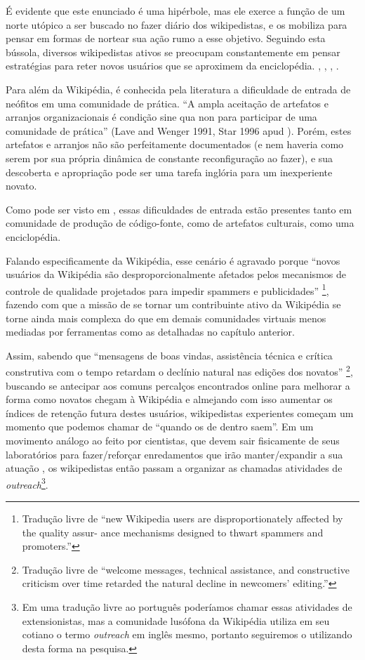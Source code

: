 É evidente que este enunciado é uma hipérbole, mas ele exerce a função de um norte utópico a ser buscado no fazer diário dos wikipedistas, e os mobiliza para pensar em formas de nortear sua ação rumo a esse objetivo. Seguindo esta bússola, diversos wikipedistas ativos se preocupam constantemente em pensar estratégias para reter novos usuários que se aproximem da enciclopédia. \citep{faulkner_etiquette_2012}, \citep{suh_singularity_2009}, \citep{musicant_mentoring_2011}, \citep{narayan_wikipedia_2017}.

Para além da Wikipédia, é conhecida pela literatura a dificuldade de entrada de neófitos em uma comunidade de prática. ``A ampla aceitação de artefatos e arranjos organizacionais é condição sine qua non para participar de uma comunidade de prática'' (Lave and Wenger 1991, Star 1996 apud \cite{feitosa_cidadao_2010}). Porém, estes artefatos e arranjos não são perfeitamente documentados (e nem haveria como serem por sua própria dinâmica de constante reconfiguração ao fazer), e sua descoberta e apropriação pode ser uma tarefa inglória para um inexperiente novato.

Como pode ser visto em \citep{steinmacher_social_2015}, essas dificuldades de entrada estão presentes tanto em comunidade de produção de código-fonte, como de artefatos culturais, como uma enciclopédia.

Falando especificamente da Wikipédia, esse cenário é agravado porque ``novos usuários da Wikipédia são desproporcionalmente afetados pelos mecanismos de controle de qualidade projetados para impedir spammers e publicidades'' \citep{schneider_accept_2014} \footnote{Tradução livre de ``new Wikipedia users are disproportionately affected by the quality assur- ance mechanisms designed to thwart spammers and promoters.''}, fazendo com que a missão de se tornar um contribuinte ativo da Wikipédia se torne ainda mais complexa do que em demais comunidades virtuais menos mediadas por ferramentas como as detalhadas no capítulo anterior.

Assim, sabendo que ``mensagens de boas vindas, assistência técnica e crítica construtiva com o tempo retardam o declínio natural nas edições dos novatos'' \citep{choi_socialization_2010}\footnote{Tradução livre de ``welcome messages, technical assistance, and constructive criticism over time retarded the natural decline in newcomers’ editing.''}, buscando se antecipar aos comuns percalços encontrados online para melhorar a forma como novatos chegam à Wikipédia e almejando com isso aumentar os índices de retenção futura destes usuários, wikipedistas experientes começam um momento que podemos chamar de  ``quando os de dentro saem''. Em um movimento análogo ao feito por cientistas, que devem sair fisicamente de seus laboratórios para fazer/reforçar enredamentos que irão manter/expandir a sua atuação \citep{latour_ciencia_1987}, os wikipedistas então passam a organizar as chamadas atividades de \textit{outreach}\footnote{Em uma tradução livre ao português poderíamos chamar essas atividades de extensionistas, mas a comunidade lusófona da Wikipédia utiliza em seu cotiano o termo \textit{outreach} em inglês mesmo, portanto seguiremos o utilizando desta forma na pesquisa.}. 

